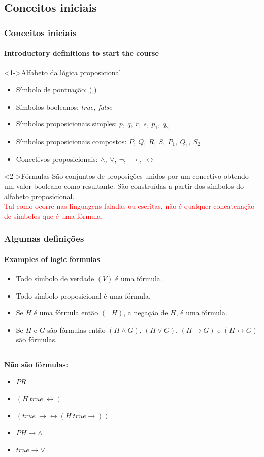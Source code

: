 \documentclass[10pt, headsepline, captions=tableabove,xcolor=table]{beamer}
\begin{document}
\subsection{Conceitos iniciais}
%
\begin{frame}[t]
    \frametitle{Conceitos iniciais}
    \framesubtitle{Introductory definitions to start the course}
    \begin{block}<1->{Alfabeto da lógica proposicional}
        \begin{itemize}
            \item Símbolo de pontuação: (,)
            \item Símbolos booleanos: \textit{true, false}
            \item Símbolos proposicionais simples: $p,~q,~r,~s,~p_1,~q_2$
            \item Símbolos proposicionais compostos: $P,~Q,~R,~S,~P_1,~Q_1,~S_2$
            \item Conectivos proposicionais: $\land,~\lor,~\lnot,~\rightarrow, ~\leftrightarrow$
        \end{itemize}
    \end{block}
    \begin{block}<2->{Fórmulas}
        \quad São conjuntos de proposições unidos por um conectivo obtendo um valor booleano como resultante. São construídas a partir dos símbolos do alfabeto proposicional.\\
        \quad \textcolor{red}{Tal como ocorre nas linguagens faladas ou escritas, não é qualquer concatenação de símbolos que é uma fórmula.}
    \end{block}
\end{frame}
%
\begin{frame}[t]
    \pagecolor{black}
    \frametitle{Algumas definições}
    \framesubtitle{Examples of logic formulas}
        \begin{itemize}
            \item Todo símbolo de verdade $(V)$ é uma fórmula.
            \item Todo símbolo proposicional é uma fórmula.
            \item Se $H$ é uma fórmula então $(\lnot H)$, a negação de $H$, é uma fórmula.
            \item Se $H$ e $G$ são fórmulas então $(H \land G)$, $(H \lor G)$, $(H \rightarrow G)$ e $(H \leftrightarrow G)$ são fórmulas. 
        \end{itemize}
        {\color{blue} \rule{\linewidth}{1mm}}
        \pause
        \textbf{Não são fórmulas:}\\
        \begin{itemize}
            \item $PR$
            \item $(H~true~\leftrightarrow)$
            \item $(true~\rightarrow \leftrightarrow (H~true \rightarrow))$
            \item $PH \rightarrow \land$
            \item $true \rightarrow \lor$
        \end{itemize}
\end{frame}
%
\end{document}

